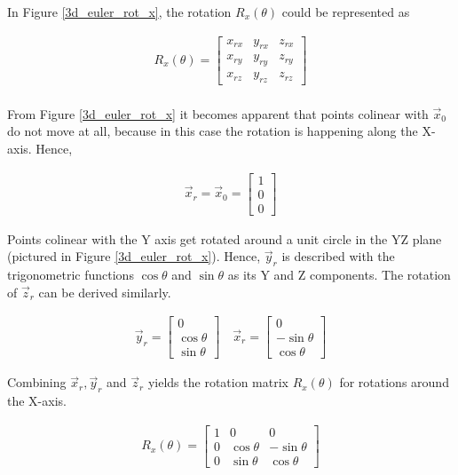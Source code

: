 \documentclass[12pt, a4paper]{article}
\begin{document}
In Figure \ref{3d_euler_rot_x}, the rotation $R_x(\theta)$ could be represented
as

\begin{align*}
    R_x(\theta) = \begin{bmatrix}
        {x}_{rx} & {y}_{rx} & {z}_{rx} \\
        {x}_{ry} & {y}_{ry} & {z}_{ry} \\
        {x}_{rz} & {y}_{rz} & {z}_{rz}
    \end{bmatrix}
\end{align*}\\

From Figure \ref{3d_euler_rot_x} it becomes apparent that points colinear with
$\vec{x}_0$ do not move at all, because in this case the rotation is happening
along the X-axis. Hence,

\begin{align*}
    \vec{x}_r = \vec{x}_0 = \begin{bmatrix} 1 \\
                              0 \\ 0\end{bmatrix}
\end{align*}

Points colinear with the Y axis get rotated around a unit circle in the YZ plane
(pictured in Figure \ref{3d_euler_rot_x}). Hence, $\vec{y}_r$ is described with
the trigonometric functions $\cos \theta$ and $\sin \theta$ as its Y and Z
components. The rotation of $\vec{z}_r$ can be derived similarly.

\begin{align*}
    \vec{y}_r = \begin{bmatrix} 0 \\ \cos\theta \\ \sin\theta
                      \end{bmatrix}
    \quad
    \vec{x}_r
    = \begin{bmatrix}
          0           \\
          -\sin\theta \\
          \cos\theta
      \end{bmatrix}
\end{align*}

Combining $\vec{x}_r, \vec{y}_r$ and $\vec{z}_r$ yields the rotation matrix
$R_x(\theta)$ for rotations around the X-axis.

\begin{align*}
    R_x(\theta)
    = \begin{bmatrix}
          1 & 0          & 0           \\
          0 & \cos\theta & -\sin\theta \\
          0 & \sin\theta & \cos\theta
      \end{bmatrix}
\end{align*}
\end{document}
